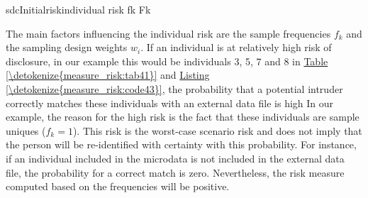 \documentclass[letterpaper,10pt,english]{sphinxmanual}
\begin{document}
\def\sphinxLiteralBlockLabel{\label{\detokenize{measure_risk:code43}}}
%
\begin{sphinxVerbatim}[commandchars=\\\{\},numbers=left,firstnumber=1,stepnumber=1]
     sdcInitialriskindividual risk fk Fk

     \PYG{p}{[}\PYG{p}{]}   
     \PYG{p}{[}\PYG{p}{]}   
     \PYG{p}{[}\PYG{p}{]}   
     \PYG{p}{[}\PYG{p}{]}   
     \PYG{p}{[}\PYG{p}{]}   
     \PYG{p}{[}\PYG{p}{]}   
     \PYG{p}{[}\PYG{p}{]}   
     \PYG{p}{[}\PYG{p}{]}   
     \PYG{p}{[}\PYG{p}{]}   
     \PYG{p}{[}\PYG{p}{]}   
\end{sphinxVerbatim}

The main factors influencing the individual risk are the sample
frequencies \(f_{k}\) and the sampling design weights \(w_{i}\).
If an individual is at relatively high risk of disclosure, in our
example this would be individuals 3, 5, 7 and 8 in \hyperref[\detokenize{measure_risk:tab41}]{Table \ref{\detokenize{measure_risk:tab41}}} and
\hyperref[\detokenize{measure_risk:code43}]{Listing \ref{\detokenize{measure_risk:code43}}}, the probability that a potential intruder correctly matches these
individuals with an external data file is high  In our example, the reason for the
high risk is the fact that these individuals are sample uniques
(\(f_{k} = 1\)). This risk is the worst-case scenario risk and does
not imply that the person will be re-identified with certainty with this
probability. For instance, if an individual included in the microdata is
not included in the external data file, the probability for a correct
match is zero. Nevertheless, the risk measure computed based on the
frequencies will be positive.
\end{document}
